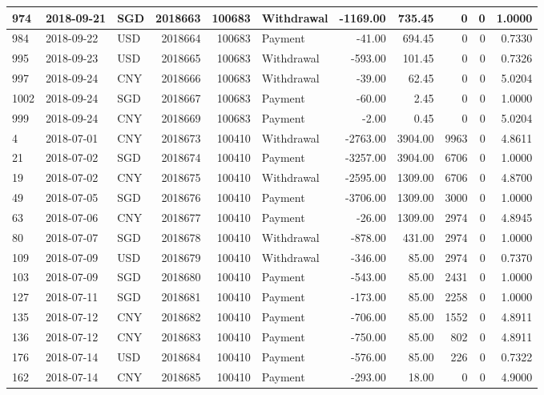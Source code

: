 \documentclass[]{article}
\begin{document}
\begin{table}[H]
\begin{tabular}{l|l|l|r|r|l|r|r|r|r|r}
\hline
974 & 2018-09-21 & SGD & 2018663 & 100683 & Withdrawal & -1169.00 & 735.45 & 0 & 0 & 1.0000\\
\hline
984 & 2018-09-22 & USD & 2018664 & 100683 & Payment & -41.00 & 694.45 & 0 & 0 & 0.7330\\
\hline
995 & 2018-09-23 & USD & 2018665 & 100683 & Withdrawal & -593.00 & 101.45 & 0 & 0 & 0.7326\\
\hline
997 & 2018-09-24 & CNY & 2018666 & 100683 & Withdrawal & -39.00 & 62.45 & 0 & 0 & 5.0204\\
\hline
1002 & 2018-09-24 & SGD & 2018667 & 100683 & Payment & -60.00 & 2.45 & 0 & 0 & 1.0000\\
\hline
999 & 2018-09-24 & CNY & 2018669 & 100683 & Payment & -2.00 & 0.45 & 0 & 0 & 5.0204\\
\hline
4 & 2018-07-01 & CNY & 2018673 & 100410 & Withdrawal & -2763.00 & 3904.00 & 9963 & 0 & 4.8611\\
\hline
21 & 2018-07-02 & SGD & 2018674 & 100410 & Payment & -3257.00 & 3904.00 & 6706 & 0 & 1.0000\\
\hline
19 & 2018-07-02 & CNY & 2018675 & 100410 & Withdrawal & -2595.00 & 1309.00 & 6706 & 0 & 4.8700\\
\hline
49 & 2018-07-05 & SGD & 2018676 & 100410 & Payment & -3706.00 & 1309.00 & 3000 & 0 & 1.0000\\
\hline
63 & 2018-07-06 & CNY & 2018677 & 100410 & Payment & -26.00 & 1309.00 & 2974 & 0 & 4.8945\\
\hline
80 & 2018-07-07 & SGD & 2018678 & 100410 & Withdrawal & -878.00 & 431.00 & 2974 & 0 & 1.0000\\
\hline
109 & 2018-07-09 & USD & 2018679 & 100410 & Withdrawal & -346.00 & 85.00 & 2974 & 0 & 0.7370\\
\hline
103 & 2018-07-09 & SGD & 2018680 & 100410 & Payment & -543.00 & 85.00 & 2431 & 0 & 1.0000\\
\hline
127 & 2018-07-11 & SGD & 2018681 & 100410 & Payment & -173.00 & 85.00 & 2258 & 0 & 1.0000\\
\hline
135 & 2018-07-12 & CNY & 2018682 & 100410 & Payment & -706.00 & 85.00 & 1552 & 0 & 4.8911\\
\hline
136 & 2018-07-12 & CNY & 2018683 & 100410 & Payment & -750.00 & 85.00 & 802 & 0 & 4.8911\\
\hline
176 & 2018-07-14 & USD & 2018684 & 100410 & Payment & -576.00 & 85.00 & 226 & 0 & 0.7322\\
\hline
162 & 2018-07-14 & CNY & 2018685 & 100410 & Payment & -293.00 & 18.00 & 0 & 0 & 4.9000\\

\end{tabular}
\end{table}
\end{document}
